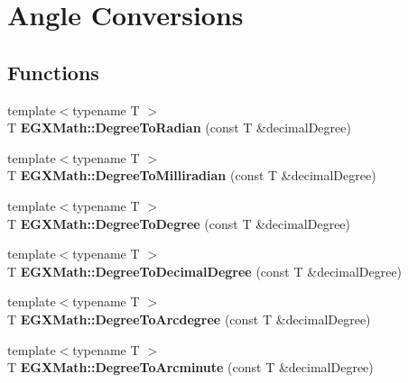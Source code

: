 \hypertarget{group___angle_conversions}{}\section{Angle Conversions}
\label{group___angle_conversions}
\subsection*{Functions}
\begin{DoxyCompactItemize}
\item 
\mbox{\label{group___angle_conversions_ga48585541b228c852c9d08a9eac3682f0}} 
{\footnotesize template$<$typename T $>$ }\\T {\bfseries E\+G\+X\+Math\+::\+Degree\+To\+Radian} (const T \&decimal\+Degree)
\item 
\mbox{\label{group___angle_conversions_gae4fa6c2d3805430760783650cfbfdb11}} 
{\footnotesize template$<$typename T $>$ }\\T {\bfseries E\+G\+X\+Math\+::\+Degree\+To\+Milliradian} (const T \&decimal\+Degree)
\item 
\mbox{\label{group___angle_conversions_gaca157e7d3e99a46a11a04b92680d2574}} 
{\footnotesize template$<$typename T $>$ }\\T {\bfseries E\+G\+X\+Math\+::\+Degree\+To\+Degree} (const T \&decimal\+Degree)
\item 
\mbox{\label{group___angle_conversions_ga568afc1d436d425bf5d4edea584aee08}} 
{\footnotesize template$<$typename T $>$ }\\T {\bfseries E\+G\+X\+Math\+::\+Degree\+To\+Decimal\+Degree} (const T \&decimal\+Degree)
\item 
\mbox{\label{group___angle_conversions_gac1b5f3b68f66c77a6df4ceef842c9b19}} 
{\footnotesize template$<$typename T $>$ }\\T {\bfseries E\+G\+X\+Math\+::\+Degree\+To\+Arcdegree} (const T \&decimal\+Degree)
\item 
\mbox{\label{group___angle_conversions_ga8abf327dc5f52907b2c881999e9cc43e}} 
{\footnotesize template$<$typename T $>$ }\\T {\bfseries E\+G\+X\+Math\+::\+Degree\+To\+Arcminute} (const T \&decimal\+Degree)

\end{DoxyCompactItemize}
